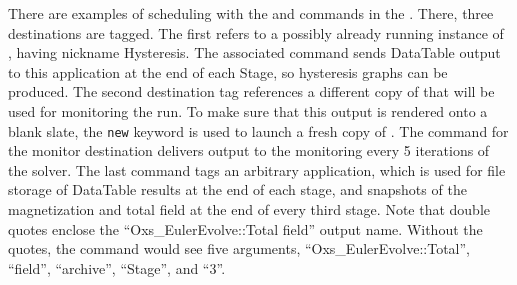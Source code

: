\begin{description}
There are examples of scheduling with the  and
 commands in the .  There,
three destinations are tagged.  The first refers to a possibly already
running instance of , having nickname Hysteresis.  The
associated  command sends DataTable output to this
application at the end of each Stage, so hysteresis graphs can be
produced.  The second destination tag references a different copy of
 that will be used for monitoring the run.  To make sure
that this output is rendered onto a blank slate, the \texttt{new}
keyword is used to launch a fresh copy of .  The
 command for the monitor destination delivers output to
the monitoring  every 5 iterations of the solver.  The last
 command tags an arbitrary  application,
which is used for file storage of DataTable results at the end of each
stage, and snapshots of the magnetization and total field at the end of
every third stage.  Note that double quotes enclose the
``Oxs\_EulerEvolve::Total field'' output name.  Without the quotes, the
 command would see five arguments,
``Oxs\_EulerEvolve::Total'', ``field'', ``archive'', ``Stage'', and
``3''.
\end{description}

